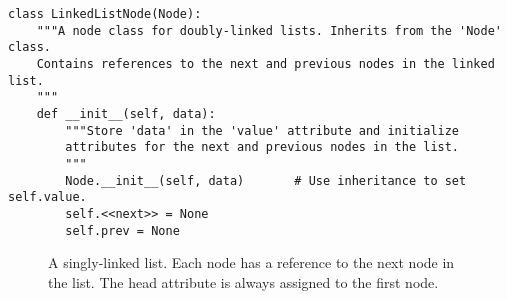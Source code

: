 \begin{lstlisting}
class LinkedListNode(Node):
    """A node class for doubly-linked lists. Inherits from the 'Node' class.
    Contains references to the next and previous nodes in the linked list.
    """
    def __init__(self, data):
        """Store 'data' in the 'value' attribute and initialize
        attributes for the next and previous nodes in the list.
        """
        Node.__init__(self, data)       # Use inheritance to set self.value.
        self.<<next>> = None
        self.prev = None
\end{lstlisting}

\begin{figure} %
\centering
{}
\caption{A singly-linked list. Each node has a reference to the next node in the list. The head attribute is always assigned to the first node.}
\label{fig:singly_linked}
\end{figure}

